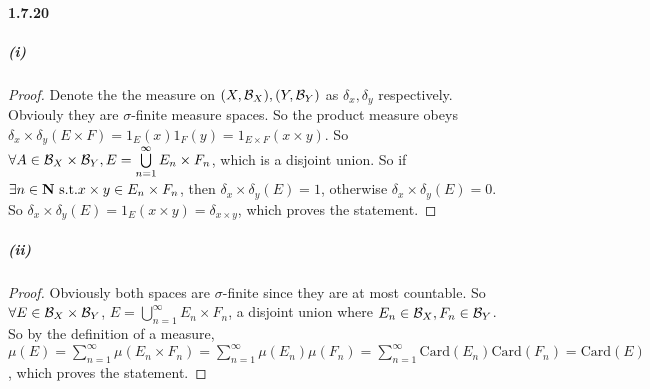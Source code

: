 \documentclass{article}
\begin{document}
\paragraph{1.7.20}
\subparagraph{(i)}
\begin{proof}
Denote the the measure on $(X,\mathcal{B}_X),(Y,\mathcal{B}_Y)$ as $\delta_x,\delta_y$ respectively. Obviouly they are $\sigma$-finite measure spaces. So the product measure obeys $\delta_x\times\delta_y(E\times F)=1_{E}(x)1_{F}(y)=1_{E\times F}(x\times y)$. So $\forall A\in \mathcal{B}_X\times\mathcal{B}_Y, E=\bigcup\limits_{n=1}^\infty E_n\times F_n$, which is a disjoint union. So if $\exists n\in \mathbf{N}\text{ s.t.} x\times y\in E_n\times F_n$, then $\delta_x\times \delta_y(E)=1$, otherwise $\delta_x\times\delta_y(E)=0$. So $\delta_x\times\delta_y(E)=1_{E}(x\times y)=\delta_{x\times y}$, which proves the statement.
\end{proof}
\subparagraph{(ii)}
\begin{proof}
Obviously both spaces are $\sigma$-finite since they are at most countable. So $\forall E\in\mathcal{B}_X\times\mathcal{B}_Y$, $E=\bigcup\limits_{n=1}^\infty E_n\times F_n$, a disjoint union where $E_n\in \mathcal{B}_X, F_n\in \mathcal{B}_Y$. So by the definition of a measure, $\mu(E)=\sum\limits_{n=1}^\infty \mu(E_n\times F_n)=\sum\limits_{n=1}^\infty \mu(E_n)\mu(F_n)=\sum\limits_{n=1}^{\infty}\mathrm{Card}(E_n)\mathrm{Card}(F_n)=\mathrm{Card}(E)$, which proves the statement.
\end{proof}
\end{document}
